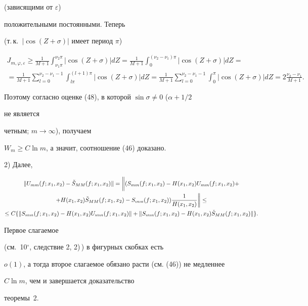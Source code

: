 \begin{pf}
(зависящими от $\varepsilon$) 


положительными постоянными. Теперь 


(т.\,к.~$|\cos(Z+\sigma)|$ имеет период $\pi$) 


\begin{multline*} 


J_{m,\varphi,\varepsilon}\ge\frac{1}{M+1} 


\int^{\nu_2\pi}_{\nu_1\pi}|\cos(Z+\sigma)|dZ=\frac{1}{M+1} 


\int^{(\nu_2-\nu_1)\pi}_0|\cos(Z+\sigma)|dZ= \\ 


% 


=\frac{1}{M+1}\sum^{\nu_2-\nu_1-1}_{l=0} 


\int^{(l+1)\pi}_{l\pi}|\cos(Z+\sigma)|dZ=\frac{1}{M+1} 


\sum^{\nu_2-\nu_1-1}_{l=0}\int^\pi_0 


|\cos(Z+\sigma)|dZ=2\frac{\nu_2-\nu_1}{M+1}. 


\end{multline*} 


Поэтому согласно оценке (48), в которой $\sin\sigma\ne 0$ ($\alpha+1/2$ 


не является 


четным; $m\to\infty$), получаем 


$W_m\ge C\ln m$, а значит, соотношение (46) доказано. 


 


2) Далее, 


\begin{multline*} 


\|U_{mm}(f;x_1,x_2)-\Check S_{MM}(f;x_1,x_2)\|= 


\bigg\|(S_{mm}(f;x_1,x_2)-H(x_1,x_2)U_{mm}(f;x_1,x_2)+ \\ 


% 


+H(x_1,x_2)\Check S_{MM}(f;x_1,x_2)-S_{mm}(f;x_1,x_2)) 


\frac{1}{H(x_1,x_2)}\bigg\|\le \\ 


% 


\le C\{\|S_{mm}(f;x_1,x_2)-H(x_1,x_2) 


U_{mm}(f;x_1,x_2)\|+\|S_{mm}(f;x_1,x_2)- 


H(x_1,x_2)\Check S_{MM}(f;x_1,x_2)\|\}. 


\end{multline*} 


Первое слагаемое 


(см.~10${}^\circ$, следствие 2, 2)\,) в фигурных скобках есть 


$o(1)$, а тогда второе слагаемое обязано расти (см. (46)) не медленнее 


$C\ln m$, чем и завершается доказательство


тео\-ре\-мы~2.~\end{pf} 


